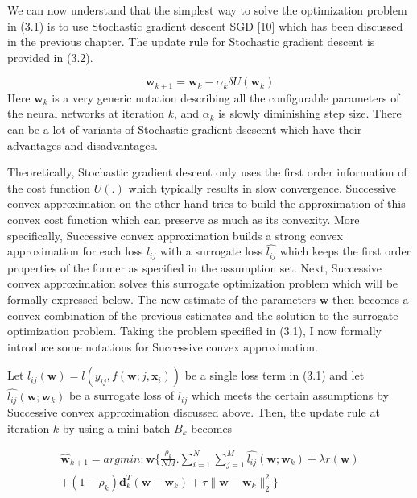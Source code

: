 We can now understand that the simplest way to solve the optimization problem in (3.1) is to use Stochastic gradient descent SGD [10] which has been discussed in the previous chapter. The update rule for Stochastic gradient descent is provided in (3.2).

\begin{equation}
\textbf{w}_{k+1} = \textbf{w}_k - \alpha_k \delta U(\textbf{w}_k)
\end{equation}
Here $\textbf{w}_k$ is a very generic notation describing all the configurable parameters of the neural networks at iteration $k$, and $\alpha_k$ is slowly diminishing step size. There can be a lot of variants of Stochastic gradient dsescent which have their advantages and disadvantages. 

Theoretically, Stochastic gradient descent only uses the first order information of the cost function $U(.)$ which typically results in slow convergence. Successive convex approximation on the other hand tries to build the approximation of this convex cost function which can preserve as much as its convexity.
More specifically, Successive convex approximation builds a strong convex approximation for each loss $l_{ij}$ with a surrogate loss $\hat{l_{ij}}$ which keeps the first order properties of the former as specified in the assumption set. Next, Successive convex approximation solves this surrogate optimization problem which will be formally expressed below. The new estimate of the parameters $\textbf{w}$ then becomes a convex combination of the previous estimates and the solution to the surrogate optimization problem.   
Taking the problem specified in (3.1), I now formally introduce some notations for Successive convex approximation.

Let $l_{ij}(\textbf{w})=l(y_{ij},f(\textbf{w};j,\textbf{x}_i))$ be a single loss term in (3.1) and let
$\hat{l_{ij}}(\textbf{w};\textbf{w}_k)$ be a surrogate loss of $l_{ij}$ which meets the certain assumptions by Successive convex approximation discussed above. Then, the update rule at iteration $k$ by using a mini batch $B_k$ becomes

\begin{equation}
\begin{aligned}
\hat{\textbf{w}}_{k+1} = argmin : \textbf{w}  \lbrace\frac{\rho_k}{NM}. \sum_{i=1}^{N} \sum_{j=1}^{M} \hat{l_{ij}} (\textbf{w};\textbf{w}_k) + \lambda r(\textbf{w})  \\ +(1-\rho_k) \textbf{d}_k^T (\textbf{w}-\textbf{w}_k) + \tau \|\textbf{w}-\textbf{w}_k\|_2^2\rbrace
\end{aligned}
\end{equation}

